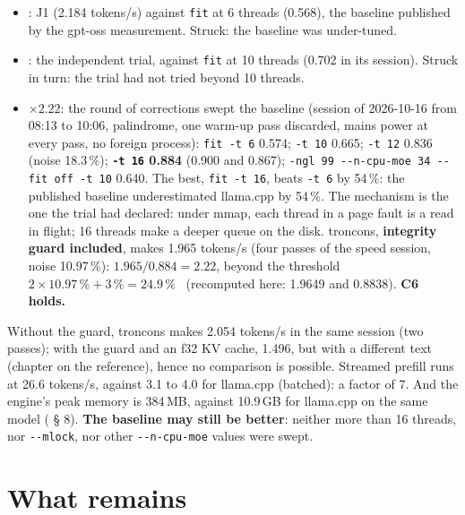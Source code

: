 \begin{itemize}
\item {}: J1 (2.184 tokens/s) against \texttt{fit} at 6 threads (0.568), the baseline published by the gpt-oss measurement. Struck: the baseline was under-tuned.
\item {}: the independent trial, against \texttt{fit} at 10 threads (0.702 in its session). Struck in turn: the trial had not tried beyond 10 threads.
\item \textbf{$\times 2.22$}: the round of corrections swept the baseline (session of 2026-10-16 from 08:13 to 10:06, palindrome, one warm-up pass discarded, mains power at every pass, no foreign process): \texttt{fit -t 6} 0.574; \texttt{-t 10} 0.665; \texttt{-t 12} 0.836 (noise 18.3\,\%); \textbf{\texttt{-t 16} 0.884} (0.900 and 0.867); \texttt{-ngl 99 -{}-n-cpu-moe 34 -{}-fit off -t 10} 0.640. The best, \texttt{fit -t 16}, beats \texttt{-t 6} by 54\,\%: the published baseline underestimated llama.cpp by 54\,\%. The mechanism is the one the trial had declared: under mmap, each thread in a page fault is a read in flight; 16 threads make a deeper queue on the disk. troncons, \textbf{integrity guard included}, makes 1.965 tokens/s (four passes of the speed session, noise 10.97\,\%): $1.965/0.884 = \mathbf{2.22}$, beyond the threshold $2 \times 10.97\,\% + 3\,\% = 24.9\,\%$ \mes~(recomputed here: 1.9649 and 0.8838). \textbf{C6 holds.}
\end{itemize}

Without the guard, troncons makes 2.054 tokens/s in the same session (two passes); with the guard and an f32 KV cache, 1.496, but with a different text (chapter on the reference), hence no comparison is possible. Streamed prefill runs at 26.6 tokens/s, against 3.1 to 4.0 for llama.cpp (batched): a factor of 7. And the engine's peak memory is 384\,MB, against 10.9\,GB for llama.cpp on the same model ( § 8). \textbf{The baseline may still be better}: neither more than 16 threads, nor \texttt{-{}-mlock}, nor other \texttt{-{}-n-cpu-moe} values were swept.

\section{What remains}\label{sec:t2o-reste}

